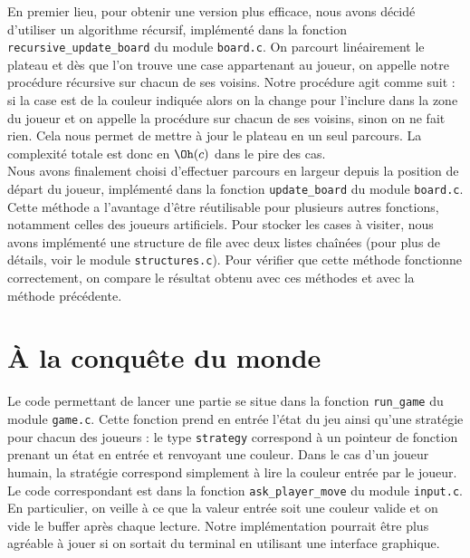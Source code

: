 \documentclass[12pt,L,fira-sans]{paper}
\begin{document}
\begin{qu}
    En premier lieu, pour obtenir une version plus efficace, nous avons décidé d'utiliser un algorithme récursif, implémenté dans la fonction \verb|recursive_update_board| du module \verb|board.c|.
    On parcourt linéairement le plateau et dès que l'on trouve une case appartenant au joueur, on appelle notre procédure récursive sur chacun de ses voisins.
    Notre procédure agit comme suit : si la case est de la couleur indiquée alors on la change pour l'inclure dans la zone du joueur et on appelle la procédure sur chacun de ses voisins, sinon on ne fait rien.
    Cela nous permet de mettre à jour le plateau en un seul parcours.
    La complexité totale est donc en \(\Oh(c)\) dans le pire des cas.\\
    Nous avons finalement choisi d'effectuer parcours en largeur depuis la position de départ du joueur, implémenté dans la fonction \verb|update_board| du module \verb|board.c|.
    Cette méthode a l'avantage d'être réutilisable pour plusieurs autres fonctions, notamment celles des joueurs artificiels.
    Pour stocker les cases à visiter, nous avons implémenté une structure de file avec deux listes chaînées (pour plus de détails, voir le module \verb|structures.c|).
    Pour vérifier que cette méthode fonctionne correctement, on compare le résultat obtenu avec ces méthodes et avec la méthode précédente.
\end{qu}

\section{À la conquête du monde}

\begin{qu}
    Le code permettant de lancer une partie se situe dans la fonction \verb|run_game| du module \verb|game.c|.
    Cette fonction prend en entrée l'état du jeu ainsi qu'une stratégie pour chacun des joueurs : le type \verb|strategy| correspond à un pointeur de fonction prenant un état en entrée et renvoyant une couleur.
    Dans le cas d'un joueur humain, la stratégie correspond simplement à lire la couleur entrée par le joueur.
    Le code correspondant est dans la fonction \verb|ask_player_move| du module \verb|input.c|.
    En particulier, on veille à ce que la valeur entrée soit une couleur valide et on vide le buffer après chaque lecture.
    Notre implémentation pourrait être plus agréable à jouer si on sortait du terminal en utilisant une interface graphique.
\end{qu}
\end{document}
